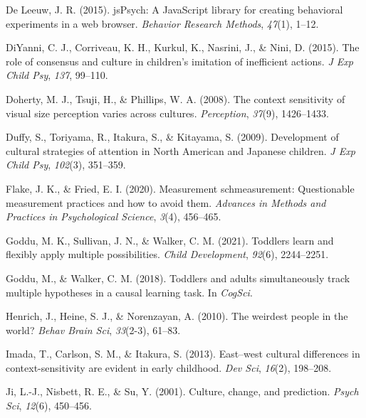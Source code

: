 \documentclass[
  man,floatsintext]{apa6}
\newlength{\cslhangindent}
\newlength{\cslentryspacingunit} %
\newenvironment{CSLReferences}[2] %
 {%
  \setlength{\parindent}{0pt}
  \ifodd #1
  \let\oldpar\par
  \def\par{\hangindent=\cslhangindent\oldpar}
  \fi
  \setlength{\parskip}{#2\cslentryspacingunit}
 }%
 {}
\begin{document}
\begin{CSLReferences}{1}{0}
\leavevmode{}%
De Leeuw, J. R. (2015). jsPsych: A JavaScript library for creating behavioral experiments in a web browser. \emph{Behavior Research Methods}, \emph{47}(1), 1--12.

\leavevmode{}%
DiYanni, C. J., Corriveau, K. H., Kurkul, K., Nasrini, J., \& Nini, D. (2015). The role of consensus and culture in children's imitation of inefficient actions. \emph{J Exp Child Psy}, \emph{137}, 99--110.

\leavevmode{}%
Doherty, M. J., Tsuji, H., \& Phillips, W. A. (2008). The context sensitivity of visual size perception varies across cultures. \emph{Perception}, \emph{37}(9), 1426--1433.

\leavevmode{}%
Duffy, S., Toriyama, R., Itakura, S., \& Kitayama, S. (2009). Development of cultural strategies of attention in {N}orth {A}merican and {J}apanese children. \emph{J Exp Child Psy}, \emph{102}(3), 351--359.

\leavevmode{}%
Flake, J. K., \& Fried, E. I. (2020). Measurement schmeasurement: Questionable measurement practices and how to avoid them. \emph{Advances in Methods and Practices in Psychological Science}, \emph{3}(4), 456--465.

\leavevmode{}%
Goddu, M. K., Sullivan, J. N., \& Walker, C. M. (2021). Toddlers learn and flexibly apply multiple possibilities. \emph{Child Development}, \emph{92}(6), 2244--2251.

\leavevmode{}%
Goddu, M., \& Walker, C. M. (2018). Toddlers and adults simultaneously track multiple hypotheses in a causal learning task. In \emph{CogSci}.

\leavevmode{}%
Henrich, J., Heine, S. J., \& Norenzayan, A. (2010). The weirdest people in the world? \emph{Behav Brain Sci}, \emph{33}(2-3), 61--83.

\leavevmode{}%
Imada, T., Carlson, S. M., \& Itakura, S. (2013). East--west cultural differences in context-sensitivity are evident in early childhood. \emph{Dev Sci}, \emph{16}(2), 198--208.

\leavevmode{}%
Ji, L.-J., Nisbett, R. E., \& Su, Y. (2001). Culture, change, and prediction. \emph{Psych Sci}, \emph{12}(6), 450--456.


\end{CSLReferences}
\end{document}

